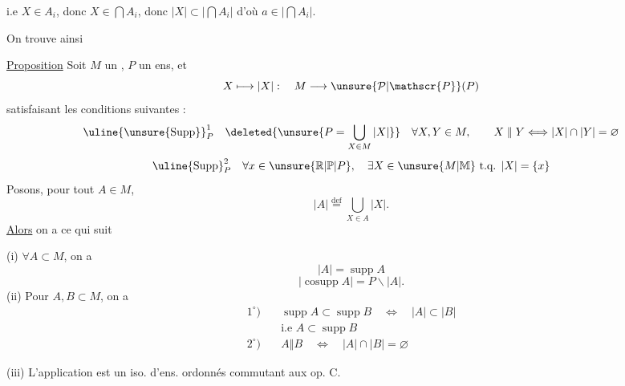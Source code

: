 i.e $X\in A_i$, donc $X\in\bigcap A_i$, donc $|X|\subset|\bigcap A_i|$ d'où $a\in|\bigcap A_i|$.

On trouve ainsi

\uline{Proposition} Soit $M$ un ,  $P$ un ens, et
\[
X\longmapsto|X|:\quad M\longrightarrow\unsure{\mathcal{P}|\mathscr{P}}(P)
\]
satisfaisant les conditions suivantes :
\[
\text{\uline{\unsure{Supp}}}_{P}^{1}\quad
\deleted{\unsure{P=\bigcup_{X\in M}|X|}}\quad
\forall X,Y\in M,\qquad X\mathrel{\Vert}Y\Longleftrightarrow|X|\cap|Y|=\varnothing
\]
\[
\text{\uline{Supp}}_{P}^{2}\quad
\forall x\in\unsure{\mathbb{R}|\mathbb{P}|P},\quad\exists X\in\unsure{M|\mathbb{M}}\text{ t.q. }|X|=\{x\}
\]
Posons, pour tout $A\in M$,
\[
|A|\overset{\text{def}}{=}\bigcup_{X\in A}|X|.
\]
\uline{Alors} on a ce qui suit

(i) $\forall A\subset M$, on a
\[
|A|=\operatorname{supp}A
\]
\[
|\operatorname{cosupp}A|=P\smallsetminus|A|.
\]
(ii) Pour $A,B\subset M$, on a
\[
\begin{aligned}
1^{\circ})\quad&\operatorname{supp}A\subset\operatorname{supp}B\quad\Longleftrightarrow\quad|A|\subset|B|\\
&\text{i.e }A\subset\operatorname{supp}B\\[3pt]
2^{\circ})\quad&A\mathrel{\Vert}B\quad\Longleftrightarrow\quad|A|\cap|B|=\varnothing
\end{aligned}
\]

(iii) L'application
est  un iso. d'ens. ordonnés commutant aux op. $\mathrm{C}$.
